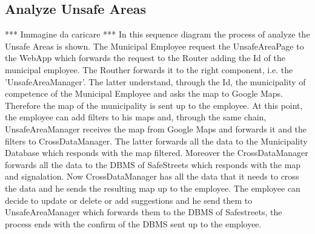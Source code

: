         \subsection{Analyze Unsafe Areas}
        ***
        Immagine da caricare
        ***
        In this sequence diagram the process of analyze the Unsafe Areas is shown. The Municipal 
        Employee request the UnsafeAreaPage to the WebApp which forwards the request to the Router 
        adding the Id of the municipal employee. The Routher forwards it to the right component, 
        i.e. the 'UnsafeAreaManager'. The latter understand, through the Id, the municipality of 
        competence of the Municipal Employee and asks the map to Google Maps. Therefore the map 
        of the municipality is sent up to the employee. At this point, the employee can add filters 
        to his maps and, through the same chain, UnsafeAreaManager receives the map from Google 
        Maps and forwards it and the filters to CrossDataManager. The latter forwards all the data 
        to the Municipality Database which responds with the map filtered. Moreover the CrossDataManager 
        forwards all the data to the DBMS of SafeStreets which responds with the map and signalation. 
        Now CrossDataManager has all the data that it needs to cross the data and he sends the resulting 
        map up to the employee. The employee can decide to update or delete or add suggestions and he 
        send them to UnsafeAreaManager which forwards them to the DBMS of Safestreets, the process ends 
        with the confirm of the DBMS sent up to the employee.

    \newpage
